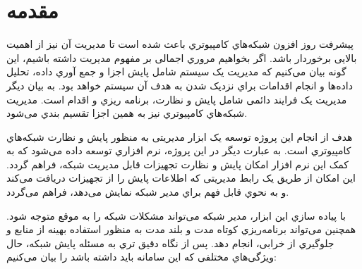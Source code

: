 \chapter{مقدمه}

پیشرفت روز افزون شبکه‌هاي کامپیوتري باعث شده است تا مدیریت آن نیز از اهمیت بالایی برخوردار باشد. اگر بخواهیم مروري اجمالی بر مفهوم مدیریت داشته باشیم، این گونه بیان می‌کنیم که مدیریت یک سیستم شامل پایش اجزا و جمع آوري داده، تحلیل داده‌ها و انجام اقدامات براي نزدیک شدن به هدف آن سیستم خواهد بود. به بیان دیگر مدیریت یک فرایند دائمی شامل پایش و نظارت، برنامه ریزي و اقدام است. مدیریت شبکه‌هاي کامپیوتري نیز به همین اجزا تقسیم بندي می‌شود.

هدف از انجام این پروژه توسعه یک ابزار مدیریتی به منظور پایش و نظارت شبکه‌هاي کامپیوتري است. به عبارت دیگر در این پروژه، نرم افزاري توسعه داده می‌شود که به کمک این نرم افزار امکان پایش و نظارت تجهیزات قابل مدیریت شبکه، فراهم گردد. این امکان از طریق یک رابط مدیریتی که اطلاعات پایش را از تجهیزات دریافت می‌کند و به نحوي قابل فهم براي مدیر شبکه نمایش می‌دهد، فراهم می‌گردد.

با پیاده سازي این ابزار، مدیر شبکه می‌تواند مشکلات شبکه را به موقع متوجه شود. همچنین می‌تواند برنامه‌ریزي کوتاه مدت و بلند مدت به منظور استفاده بهینه از منابع و جلوگیري از خرابی، انجام دهد. پس از نگاه دقیق تري به مسئله پایش شبکه، حال ویژگی‌هاي مختلفی که این سامانه باید داشته باشد را بیان می‌کنیم:

